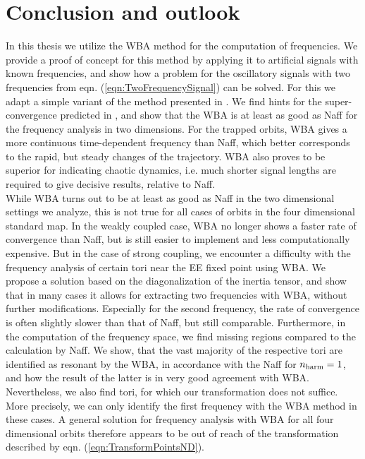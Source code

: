 \chapter{Conclusion and outlook}
In this thesis we utilize the WBA method for the computation of frequencies.
We provide a proof of concept for this method by applying it to artificial signals with known frequencies, and show how a problem for the oscillatory signals with two frequencies from eqn. (\ref{eqn:TwoFrequencySignal}) can be solved.
For this we adapt a simple variant of the method presented in \cite{DasSaiSanYor2019}.
We find hints for the super-convergence predicted in \cite{DasSaiSanYor2017}, and show that the WBA is at least as good as Naff for the frequency analysis in two dimensions.
For the trapped orbits, WBA gives a more continuous time-dependent frequency than Naff, which better corresponds to the rapid, but steady changes of the trajectory.
WBA also proves to be superior for indicating chaotic dynamics, i.e. much shorter signal lengths are required to give decisive results, relative to Naff.
\\
While WBA turns out to be at least as good as Naff in the two dimensional settings we analyze, this is not true for all cases of orbits in the four dimensional standard map.
In the weakly coupled case, WBA no longer shows a faster rate of convergence than Naff, but is still easier to implement and less computationally expensive.
But in the case of strong coupling, we encounter a difficulty with the frequency analysis of certain tori near the EE fixed point using WBA.
We propose a solution based on the diagonalization of the inertia tensor, and show that in many cases it allows for extracting two frequencies with WBA, without further modifications.
Especially for the second frequency, the rate of convergence is often slightly slower than that of Naff, but still comparable.
Furthermore, in the computation of the frequency space, we find missing regions compared to the calculation by Naff.
We show, that the vast majority of the respective tori are identified as resonant by the WBA, in accordance with the Naff for $n_\text{harm}=1$, and how the result of the latter is in very good agreement with WBA.
Nevertheless, we also find tori, for which our transformation does not suffice.
More precisely, we can only identify the first frequency with the WBA method in these cases.
A general solution for frequency analysis with WBA for all four dimensional orbits therefore appears to be out of reach of the transformation described by eqn. (\ref{eqn:TransformPointsND}).
